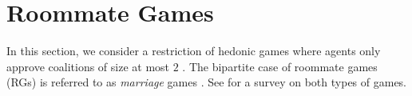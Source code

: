 \documentclass[letterpaper]{article} %
\newtheorem{theorem}{Theorem}
\newtheorem{lemma}{Lemma}
\begin{document}
\section{Roommate Games}
\label{sec:Roommates}
In this section, we consider a restriction of hedonic games where agents only approve coalitions of size at most $2$ \cite{gardenfors1975match}. The bipartite case of roommate games (RGs) is referred to as \textit{marriage} games \cite{gale1962college}. See \cite{gusfield1989stable} for a survey on both types of games. %
\end{document}
